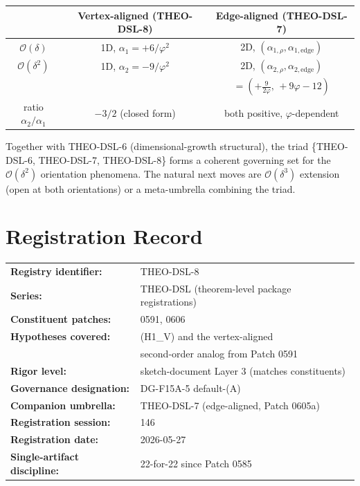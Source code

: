 \documentclass[11pt]{article}
\begin{document}
\begin{center}
\begin{tabular}{c|c|c}
\hline
 & Vertex-aligned (THEO-DSL-8) & Edge-aligned (THEO-DSL-7) \\
\hline
$\mathcal{O}(\delta)$
 & 1D, $\alpha_1 = +6/\varphi^2$
 & 2D, $(\alpha_{1,\rho}, \alpha_{1,\text{edge}})$ \\[2pt]
$\mathcal{O}(\delta^2)$
 & 1D, $\alpha_2 = -9/\varphi^2$
 & 2D, $(\alpha_{2,\rho}, \alpha_{2,\text{edge}})$ \\
 &
 & $= (+\tfrac{9}{2\varphi},\, +9\varphi-12)$ \\[2pt]
ratio $\alpha_2/\alpha_1$
 & $-3/2$ (closed form)
 & both positive, $\varphi$-dependent \\
\hline
\end{tabular}
\end{center}

Together with THEO-DSL-6 (dimensional-growth structural), the triad
\{THEO-DSL-6, THEO-DSL-7, THEO-DSL-8\} forms a coherent governing set
for the $\mathcal{O}(\delta^2)$ orientation phenomena. The natural next
moves are $\mathcal{O}(\delta^3)$ extension (open at both orientations)
or a meta-umbrella combining the triad.

\section{Registration Record}

\begin{center}
\begin{tabular}{ll}
\hline
\textbf{Registry identifier:} & THEO-DSL-8 \\
\textbf{Series:} & THEO-DSL (theorem-level package registrations) \\
\textbf{Constituent patches:} & 0591, 0606 \\
\textbf{Hypotheses covered:} & (H1\_V) and the vertex-aligned \\
 & second-order analog from Patch 0591 \\
\textbf{Rigor level:} & sketch-document Layer 3 (matches constituents) \\
\textbf{Governance designation:} & DG-F15A-5 default-(A) \\
\textbf{Companion umbrella:} & THEO-DSL-7 (edge-aligned, Patch 0605a) \\
\textbf{Registration session:} & 146 \\
\textbf{Registration date:} & 2026-05-27 \\
\textbf{Single-artifact discipline:} & 22-for-22 since Patch 0585 \\
\hline
\end{tabular}
\end{center}
\end{document}
